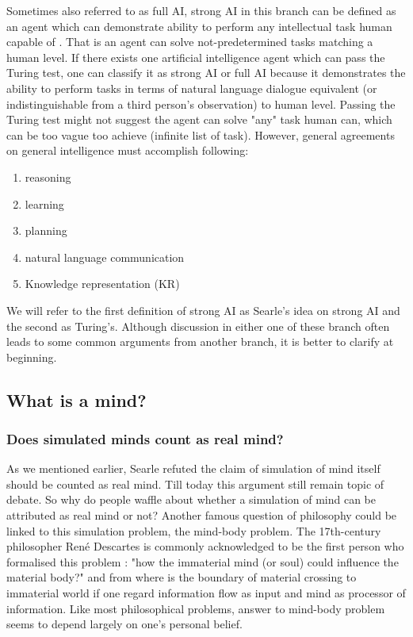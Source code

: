 \documentclass[11pt]{article}
\newcommand{\dr}[1]{{\color{dark-cornflower-blue-2} #1}}
\newenvironment{draft}{\color{dark-cornflower-blue-2}}{\ignorespacesafterend}
\begin{document}
\begin{draft}
Sometimes also referred to as full AI, strong AI in this branch can be defined as an agent which can demonstrate ability to perform any intellectual task human capable of \cite{kurzweil2005singularity}. That is an agent can solve not-predetermined tasks matching a human level. If there exists one artificial intelligence agent which can pass the Turing test, one can classify it as strong AI or full AI because it demonstrates the ability to perform tasks in terms of natural language dialogue equivalent (or indistinguishable from a third person's observation) to human level. Passing the Turing test might not suggest the agent can solve "any" task human can, which can be too vague too achieve (infinite list of task). However, general agreements on general intelligence must accomplish following:
\begin{enumerate}
\item reasoning
\item learning
\item planning
\item natural language communication
\item Knowledge representation (KR) 
\end{enumerate}

We will refer to the first definition of strong AI as Searle's idea on strong AI and the second as Turing's. Although discussion in either one of these branch often leads to some common arguments from another branch, it is better to clarify at beginning. 
\end{draft}

\subsection{What is a mind?}

\subsubsection*{Does simulated minds count as real mind?}

\dr{
As we mentioned earlier, Searle refuted the claim of simulation of mind itself should be counted as real mind. Till today this argument still remain topic of debate. So why do people waffle about whether a simulation of mind can be attributed as real mind or not? Another famous question of philosophy could be linked to this simulation problem, the mind-body problem. The 17th-century philosopher Ren{\'e} Descartes is commonly acknowledged to be the first person who formalised this problem \cite{descartes1641meditationes}: "how the immaterial mind (or soul) could influence the material body?" and from where is the boundary of material crossing to immaterial world if one regard information flow as input and mind as processor of information. Like most philosophical problems, answer to mind-body problem seems to depend largely on one's personal belief.
}
\end{document}
